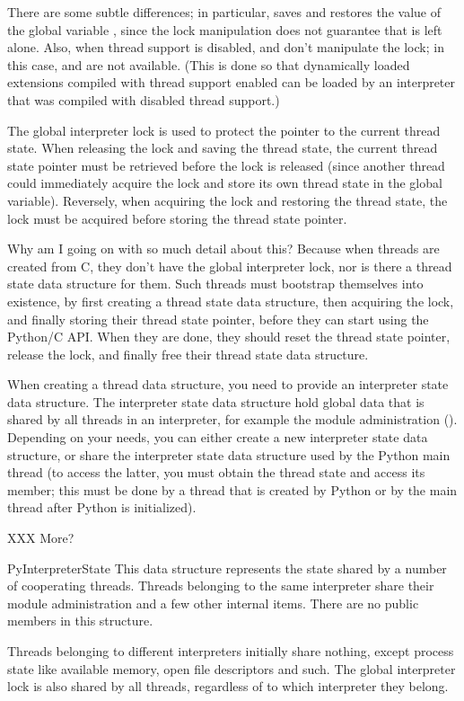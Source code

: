 \documentclass[twoside]{report}
\begin{document}
There are some subtle differences; in particular,
 saves and restores the value of the
global variable , since the lock manipulation does not
guarantee that  is left alone.  Also, when thread support
is disabled,  and
 don't manipulate the lock; in this case,
 and  are not
available.  (This is done so that dynamically loaded extensions
compiled with thread support enabled can be loaded by an interpreter
that was compiled with disabled thread support.)

The global interpreter lock is used to protect the pointer to the
current thread state.  When releasing the lock and saving the thread
state, the current thread state pointer must be retrieved before the
lock is released (since another thread could immediately acquire the
lock and store its own thread state in the global variable).
Reversely, when acquiring the lock and restoring the thread state, the
lock must be acquired before storing the thread state pointer.

Why am I going on with so much detail about this?  Because when
threads are created from C, they don't have the global interpreter
lock, nor is there a thread state data structure for them.  Such
threads must bootstrap themselves into existence, by first creating a
thread state data structure, then acquiring the lock, and finally
storing their thread state pointer, before they can start using the
Python/C API.  When they are done, they should reset the thread state
pointer, release the lock, and finally free their thread state data
structure.

When creating a thread data structure, you need to provide an
interpreter state data structure.  The interpreter state data
structure hold global data that is shared by all threads in an
interpreter, for example the module administration
().  Depending on your needs, you can either create
a new interpreter state data structure, or share the interpreter state
data structure used by the Python main thread (to access the latter,
you must obtain the thread state and access its  member;
this must be done by a thread that is created by Python or by the main
thread after Python is initialized).

XXX More?

\begin{ctypedesc}{PyInterpreterState}
This data structure represents the state shared by a number of
cooperating threads.  Threads belonging to the same interpreter
share their module administration and a few other internal items.
There are no public members in this structure.

Threads belonging to different interpreters initially share nothing,
except process state like available memory, open file descriptors and
such.  The global interpreter lock is also shared by all threads,
regardless of to which interpreter they belong.
\end{ctypedesc}
\end{document}
